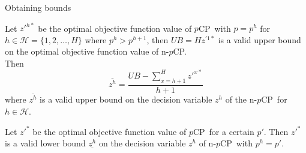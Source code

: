 \documentclass[utf8,aspectratio=169,ngerman,english]{beamer}
\newcommand{\nPCE}{\hyperref[eq:nPCE]{\texttt{(nPC3)}}}
\newcommand{\nPCY}{\hyperref[eq:nPCY]{\texttt{(nPC2)}}}
\newcommand{\pCP}{$p$CP}
\newcommand{\npCP}{n-$p$CP}
\begin{document}
\begin{frame}[allowframebreaks]{Obtaining bounds}
    \begin{lemma}\label{lemma:upperbounds}
        Let $z'^{h*}$ be the optimal objective function value of \pCP\ with $p = p^h$ for $h \in \mathcal H = \{1, 2, \dots, H\}$ where $p^h > p^{h+1}$, then
        $UB = H z^{'1*}$ is a valid upper bound on the optimal objective function value of \npCP. \\
        Then
        \begin{equation*}
            \overline{z^h} = \frac{UB - \sum_{x = h+1}^{H}z'^{x*}}{h+1}
        \end{equation*}
        where $\overline{z^h}$ is a valid upper bound on the decision variable $z^h$ of the \npCP\ for $h \in \mathcal H$.
    \end{lemma}
    \begin{lemma}\label{lemma:lowerbounds}
        Let $z'^{*}$ be the optimal objective function value of \pCP\ for a certain $p'$. Then $z'^{*}$ is a valid lower bound $\underline{z^h}$ on the decision variable $z^h$ of \npCP\ with $p^h = p'$.
    \end{lemma}
\end{frame}
\end{document}
